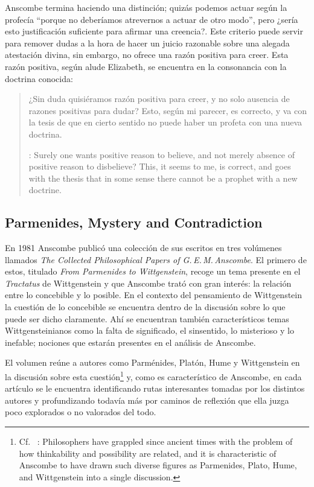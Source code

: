 Anscombe termina haciendo una distinción; quizás podemos actuar según la
profecía \enquote{porque no deberíamos atrevernos a actuar de otro modo}, pero
¿sería esto justificación suficiente para afirmar una creencia?. Este criterio
puede servir para remover dudas a la hora de hacer un juicio razonable sobre una
alegada atestación divina, sin embargo, no ofrece una razón positiva para creer.
Esta razón positiva, según alude Elizabeth, se encuentra en la consonancia con
la doctrina conocida: \blockquote[{\cite[39]{anscombe2008faith:prophandmi}}:
Surely one wants positive reason to believe, and not merely absence of positive
reason to disbelieve? This, it seems to me, is correct, and goes with the thesis
that in some sense there cannot be a prophet with a new doctrine. ]{¿Sin duda
  quisiéramos razón positiva para creer, y no solo ausencia de razones positivas
  para dudar? Esto, según mi parecer, es correcto, y va con la tesis de que en
  cierto sentido no puede haber un profeta con una nueva doctrina.}

\subsection{Parmenides, Mystery and Contradiction}

En 1981 Anscombe publicó una colección de sus escritos en tres volúmenes
llamados \emph{The Collected Philosophical Papers of G.\,E.\,M.\,Anscombe}. El
primero de estos, titulado \emph{From Parmenides to Wittgenstein}, recoge un tema
presente en el \emph{Tractatus} de Wittgenstein y que Anscombe trató con gran
interés: la relación entre lo concebible y lo posible. En el contexto del
pensamiento de Wittgenstein la cuestión de lo concebible se encuentra dentro de
la discusión sobre lo que puede ser dicho claramente. Ahí se encuentran también
característicos temas Wittgensteinianos como la falta de significado, el
sinsentido, lo misterioso y lo inefable; nociones que estarán presentes en el
análisis de Anscombe.

El volumen reúne a autores como Parménides, Platón, Hume y Wittgenstein en la
discusión sobre esta cuestión\footnote{Cf.~ \cite[193]{teichmann2008ans}:
  Philosophers have grappled since ancient times with the problem of how
  thinkability and possibility are related, and it is characteristic of Anscombe
  to have drawn such diverse figures as Parmenides, Plato, Hume, and
  Wittgenstein into a single discussion.} y, como es característico de
Anscombe, en cada artículo se le encuentra identificando rutas interesantes
tomadas por los distintos autores y profundizando todavía más por caminos de
reflexión que ella juzga poco explorados o no valorados del todo.

